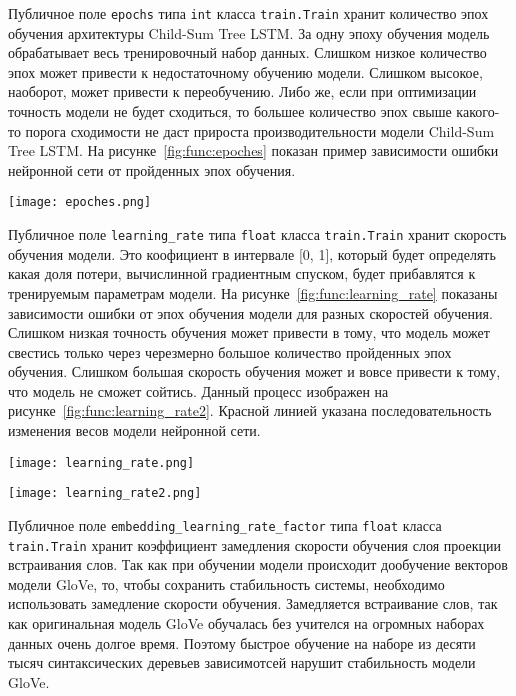 Публичное поле \texttt{epochs} типа \texttt{int} класса \texttt{train.Train} хранит количество эпох обучения архитектуры Child-Sum Tree LSTM\@. За одну эпоху обучения модель обрабатывает весь тренировочный набор данных. Слишком низкое количество эпох может привести к недостаточному обучению модели. Слишком высокое, наоборот, может привести к переобучению. Либо же, если при оптимизации точность модели не будет сходиться, то большее количество эпох свыше какого-то порога сходимости не даст прироста производительности модели Child-Sum Tree LSTM\@. На рисунке~\ref{fig:func:epoches} показан пример зависимости ошибки нейронной сети от пройденных эпох обучения.

\begin{center}
  \texttt{[image: epoches.png]}
  \label{fig:func:epoches}
\end{center}

Публичное поле \texttt{learning\_rate} типа \texttt{float} класса \texttt{train.Train} хранит скорость обучения модели. Это коофициент в интервале [0, 1], который будет определять какая доля потери, вычислинной градиентным спуском, будет прибавлятся к тренируемым параметрам модели. На рисунке~\ref{fig:func:learning_rate} показаны зависимости ошибки от эпох обучения модели для разных скоростей обучения. Слишком низкая точность обучения может привести в тому, что модель может свестись только через черезмерно большое количество пройденных эпох обучения. Слишком большая скорость обучения может и вовсе привести к тому, что модель не сможет сойтись. Данный процесс изображен на рисунке~\ref{fig:func:learning_rate2}. Красной линией указана последовательность изменения весов модели нейронной сети.

\begin{center}
  \texttt{[image: learning\_rate.png]}
  \label{fig:func:learning_rate}
\end{center}

\begin{center}
  \texttt{[image: learning\_rate2.png]}
  \label{fig:func:learning_rate2}
\end{center}

Публичное поле \texttt{embedding\_learning\_rate\_factor} типа \texttt{float} класса \texttt{train.Train} хранит коэффициент замедления скорости обучения слоя проекции встраивания слов. Так как при обучении модели происходит дообучение векторов модели GloVe, то, чтобы сохранить стабильность системы, необходимо использовать замедление скорости обучения. Замедляется встраивание слов, так как оригинальная модель GloVe обучалась без учителся на огромных наборах данных очень долгое время. Поэтому быстрое обучение на наборе из десяти тысяч синтаксических деревьев зависимотсей нарушит стабильность модели GloVe.

